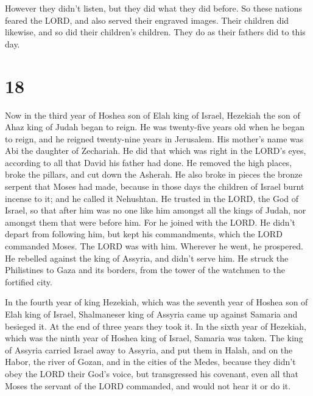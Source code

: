  However they didn't listen, but they did what they did
before.  So these nations feared the LORD, and also served
their engraved images. Their children did likewise, and so did their
children's children. They do as their fathers did to this day.

\hypertarget{section-17}{%
\section{18}\label{section-17}}

 Now in the third year of Hoshea son of Elah king of Israel,
Hezekiah the son of Ahaz king of Judah began to reign.  He
was twenty-five years old when he began to reign, and he reigned
twenty-nine years in Jerusalem. His mother's name was Abi the daughter
of Zechariah.  He did that which was right in the LORD's
eyes, according to all that David his father had done.  He
removed the high places, broke the pillars, and cut down the Asherah. He
also broke in pieces the bronze serpent that Moses had made, because in
those days the children of Israel burnt incense to it; and he called it
Nehushtan.  He trusted in the LORD, the God of Israel, so
that after him was no one like him amongst all the kings of Judah, nor
amongst them that were before him.  For he joined with the
LORD. He didn't depart from following him, but kept his commandments,
which the LORD commanded Moses.  The LORD was with him.
Wherever he went, he prospered. He rebelled against the king of Assyria,
and didn't serve him.  He struck the Philistines to Gaza and
its borders, from the tower of the watchmen to the fortified city.

 In the fourth year of king Hezekiah, which was the seventh
year of Hoshea son of Elah king of Israel, Shalmaneser king of Assyria
came up against Samaria and besieged it.  At the end of
three years they took it. In the sixth year of Hezekiah, which was the
ninth year of Hoshea king of Israel, Samaria was taken. 
The king of Assyria carried Israel away to Assyria, and put them in
Halah, and on the Habor, the river of Gozan, and in the cities of the
Medes,  because they didn't obey the LORD their God's
voice, but transgressed his covenant, even all that Moses the servant of
the LORD commanded, and would not hear it or do it.

